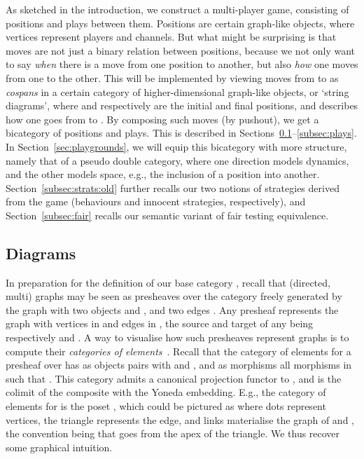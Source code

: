 \documentclass{LMCS}
\theoremstyle{plain}\newtheorem{satz}[thm]{Satz}
\begin{document}
As sketched in the introduction, we construct a
multi-player game, consisting of positions and plays between
them. Positions are certain graph-like objects, where vertices
represent players and channels.  But what might be surprising is that
moves are not just a binary relation between positions, because we not
only want to say \emph{when} there is a move from one position to
another, but also \emph{how} one moves from one to the other. This
will be implemented by viewing moves from  to  as \emph{cospans}
 in a certain category  of
higher-dimensional graph-like objects, or `string diagrams', where 
and  respectively are the initial and final positions, and 
describes how one goes from  to .  By composing such moves (by
pushout), we get a bicategory  of positions and plays. This is
described in Sections~\ref{subsec:diagrams}--\ref{subsec:plays}.  In
Section~\ref{sec:playgrounds}, we will equip this bicategory with more
structure, namely that of a pseudo double category, where one
direction models dynamics, and the other models space, e.g., the
inclusion of a position into another.  Section~\ref{subsec:strats:old}
further recalls our two notions of strategies derived from the game
(behaviours and innocent strategies, respectively), and
Section~\ref{subsec:fair} recalls our semantic variant of fair testing
equivalence.

\subsection{Diagrams}\label{subsec:diagrams}
In preparation for the definition of our base category , recall
that (directed, multi) graphs may be seen as presheaves over the
category freely generated by the graph with two objects  and
, and two edges . Any presheaf 
represents the graph with vertices in  and edges in ,
the source and target of any  being respectively  and . A way to visualise how such presheaves represent
graphs is to compute their \emph{categories of
  elements}~\cite{MM}. Recall that the category of elements 
for a presheaf  over  has as objects pairs  with  and , and as morphisms  all morphisms
 in  such that . This category
admits a canonical projection functor  to , and  is the colimit of
the composite  with the
Yoneda embedding. E.g., the category of elements for  is
the poset ,
which could be pictured as
 \hspace*{-.7em} where dots represent vertices, the triangle
represents the edge, and links materialise the graph of  and
, the convention being that  goes from the apex of the
triangle.  We thus recover some graphical intuition.
\end{document}
